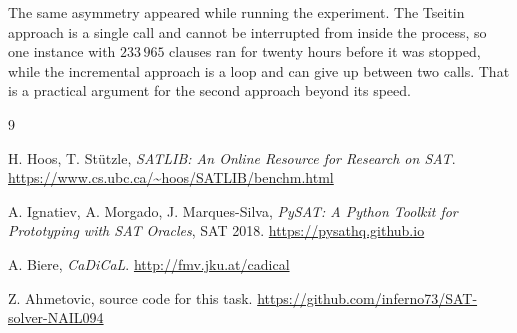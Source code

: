 \documentclass[11pt,a4paper]{article}
\begin{document}
The same asymmetry appeared while running the experiment. The Tseitin approach
is a single call and cannot be interrupted from inside the process, so one
instance with $233\,965$ clauses ran for twenty hours before it was stopped,
while the incremental approach is a loop and can give up between two calls.
That is a practical argument for the second approach beyond its speed.

\clearpage

\begin{thebibliography}{9}

H. Hoos, T. St\"utzle, \emph{SATLIB: An Online Resource for Research on SAT}.
\url{https://www.cs.ubc.ca/~hoos/SATLIB/benchm.html}

A. Ignatiev, A. Morgado, J. Marques-Silva,
\emph{PySAT: A Python Toolkit for Prototyping with SAT Oracles}, SAT 2018.
\url{https://pysathq.github.io}

A. Biere, \emph{CaDiCaL}.
\url{http://fmv.jku.at/cadical}

Z. Ahmetovic, source code for this task.
\url{https://github.com/inferno73/SAT-solver-NAIL094}

\end{thebibliography}
\end{document}
